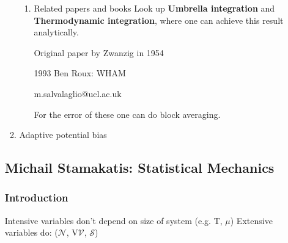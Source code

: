 \documentclass[11pt]{article}
\begin{document}
\begin{enumerate}
\begin{enumerate}
\begin{enumerate}
\item Related papers and books
\label{sec:org32bb0d3}
Look up \textbf{Umbrella integration} and \textbf{Thermodynamic integration}, where one can achieve this result analytically. 

Original paper by Zwanzig in 1954

1993 Ben Roux: WHAM

m.salvalaglio@ucl.ac.uk


For the error of these one can do block averaging.
\end{enumerate}


\item Adaptive potential bias
\label{sec:org9c51514}
\end{enumerate}

\subsection{Michail Stamakatis: Statistical Mechanics}
\label{sec:org03139ce}

\subsubsection{Introduction}
\label{sec:orgfede7d4}
Intensive variables don't depend on size of system (e.g. T, \(\mu\))
Extensive variables do: (\(\mathcal{N}\), V\(\mathcal{V}\), \(\mathcal{S}\))

\end{enumerate}
\end{document}
